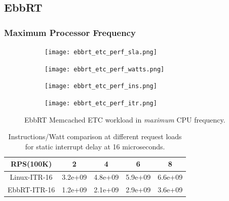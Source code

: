 \documentclass[letterpaper,twocolumn,10pt]{article}
\begin{document}
%

\subsection{EbbRT}
\subsubsection{Maximum Processor Frequency}
\label{sec:ebbrt_max}
\begin{figure}
 \begin{subfigure}[b]{0.5\textwidth}
   \texttt{[image: ebbrt\_etc\_perf\_sla.png]}
   \caption{}
   \label{fig:ebbrt_etc_perf:sla}
 \end{subfigure}
 \begin{subfigure}[b]{0.5\textwidth}
   \texttt{[image: ebbrt\_etc\_perf\_watts.png]}
   \caption{}
   \label{fig:ebbrt_etc_perf:watts}
 \end{subfigure}
 \begin{subfigure}[b]{0.5\textwidth}
    \texttt{[image: ebbrt\_etc\_perf\_ins.png]}
    \label{fig:ebbrt_etc_perf:ins}
  \end{subfigure}
  \begin{subfigure}[b]{0.5\textwidth}
    \texttt{[image: ebbrt\_etc\_perf\_itr.png]}
    \label{fig:ebbrt_etc_perf:itrs}
  \end{subfigure}  
  \caption{EbbRT Memcached ETC workload in \textit{maximum} CPU frequency.}
  \label{fig:ebbrt_etc_perf:main}
\end{figure}

\begin{table}[h!]
\centering
\begin{tabular}{ |c|c|c|c|c| } 
 \hline
 RPS(100K) & 2 & 4 & 6 & 8 \\
 \hline
 Linux-ITR-16 & 3.2e+09 & 4.8e+09 & 5.9e+09 & 6.6e+09 \\
 EbbRT-ITR-16 & 1.2e+09 & 2.1e+09 & 2.9e+09 & 3.6e+09 \\
 \hline
\end{tabular}
\caption{Instructions/Watt comparison at different request loads for static interrupt delay at 16 microseconds.}
\label{tab:ins_per_watt}
\end{table}
\end{document}
